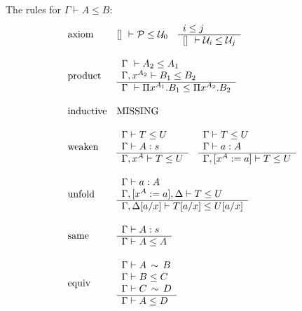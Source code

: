 The rules for $\Gamma \vdash A \le B$:
$$
\vertlist {
    \text{axiom} &
    [] \vdash \Prop \le \Any_0
    \quad
    \rulev {
        i \le j
    }
    {
        [] \vdash \Any_i \le \Any_j
    }
    \\
    \\
    \text{product} &
    \rulev {
        \Gamma \vdash A_2 \le A_1
        \\
        \Gamma, x^{A_2} \vdash B_1 \le B_2
    }
    {
        \Gamma \vdash \Pi x^{A_1}.B_1 \le \Pi x^{A_2}. B_2
    }
    \\
    \\
    \text{inductive} &
    \text{MISSING}
    \\
    \\
    \text{weaken} &
    \rulev {
        \Gamma \vdash T \le U
        \\
        \Gamma \vdash A : s
    }
    {
        \Gamma, x^A \vdash T \le U
    }
    \quad
    \rulev {
        \Gamma \vdash T \le U
        \\
        \Gamma \vdash a: A
    }
    {
        \Gamma, [x^A := a] \vdash T \le U
    }
    \\
    \\
    \text{unfold} &
    \rulev {
        \Gamma \vdash a : A
        \\
        \Gamma,[x^A:=a],\Delta \vdash T \le U
    }
    {
        \Gamma,\Delta[a/x] \vdash T[a/x] \le U[a/x]
    }
    \\
    \\
    \text{same} &
    \rulev {
        \Gamma \vdash A: s
    }
    {
        \Gamma \vdash A \le A
    }
    \\
    \\
    \text{equiv} &
    \rulev {
        \Gamma \vdash A \equiv B
        \\
        \Gamma \vdash B \le C
        \\
        \Gamma \vdash C \equiv D
    }
    {
        \Gamma \vdash A \le D
    }
}
$$
